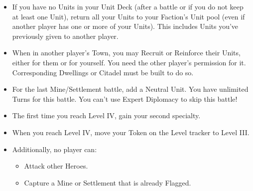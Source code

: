 \begin{multicols*}{2}
\begin{itemize}
  \item If you have no Units in your Unit Deck (after a battle or if you do not keep at least one Unit), return all your Units to your Faction's Unit pool (even if another player has one or more of your Units). This includes Units you've previously given to another player.

  \item When in another player's Town, you may Recruit or Reinforce their Units, either for them or for yourself. You need the other player's permission for it. Corresponding Dwellings or Citadel must be built to do so.

  \item For the last Mine/Settlement battle, add a  Neutral Unit. You have unlimited Turns for this battle. You can't use Expert Diplomacy to skip this battle!

  \vspace*{\fill}\columnbreak

  \item The first time you reach Level IV, gain your second specialty.

  \item When you reach Level IV, move your Token on the Level tracker to Level III.

  \item Additionally, no player can:
  \begin{itemize}
    \item Attack other Heroes.
    \item Capture a Mine or Settlement that is already Flagged.
  \end{itemize}
\end{itemize}

\vspace*{\fill}

\end{multicols*}
